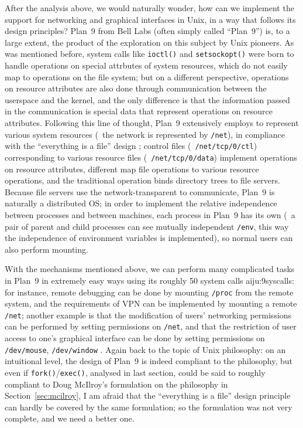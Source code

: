 After the analysis above, we would naturally wonder, how can we implement the
support for networking and graphical interfaces in Unix, in a way that follows
its design principles?  Plan~9 from Bell Labs (often simply called ``Plan~9'')
is, to a large extent, the product of the exploration on this subject by Unix
pioneers.  As was mentioned before, system calls like
\verb|ioctl()| and \verb|setsockopt()| were born to handle operations on
special attrbutes of system resources, which do not easily map to operations
on the file system; but on a different perspective, operations on resource
attributes are also done through communication between the userspace and the
kernel, and the only difference is that the information passed in the
communication is special data that represent operations on resource attributes.
Following this line of thought, Plan~9 extensively employs  to represent various system resources (\eg~the network is represented
by \verb|/net|), in compliance with the ``everything is a file'' design%
; control files (\eg~\verb|/net/tcp/0/ctl|) corresponding
to various resource files (\eg~\verb|/net/tcp/0/data|) implement operations
on resource attributes, different  map file operations
to various resource operations, and the traditional 
operation binds directory trees to file servers.  Because file servers use
the network-transparent  to communicate, Plan~9 is
naturally a distributed OS; in order to implement the relative independence
between processes and between machines, each process in Plan~9 has its own
 (\eg~a pair of parent and child processes can see mutually
independent \verb|/env|, this way the independence of environment variables
is implemented), so normal users can also perform mounting.

With the mechanisms mentioned above, we can perform many complicated tasks in
Plan~9 in extremely easy ways using its roughly 50 system calls\cupercite%
{aiju:9syscalls}: for instance, remote debugging can be done by mounting
\verb|/proc| from the remote system, and the requirements of VPN can be
implemented by mounting a remote \verb|/net|; another example is that the
modification of users' networking permissions can be performed by setting
permissions on \verb|/net|, and that the restriction of user access to one's
graphical interface can be done by setting permissions on \verb|/dev/mouse|,
\verb|/dev/window| \etc.  Again back to the topic of Unix philosophy: on an
intuitional level, the design of Plan~9 is indeed compliant to the philosophy,
but even if \verb|fork()|/\verb|exec()|, analysed in last section, could be
said to roughly compliant to Doug McIlroy's formulation on the philosophy in
Section~\ref{sec:mcilroy}, I am afraid that the ``everything is a file''
design principle can hardly be covered by the same formulation; so
the formulation was not very complete, and we need a better one.

